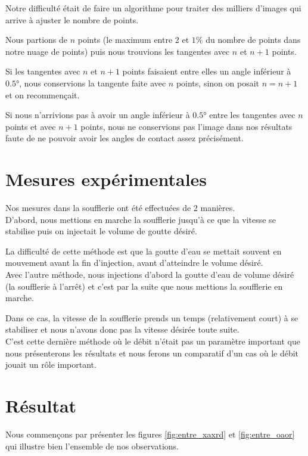 Notre difficulté était de faire un algorithme pour traiter des milliers d'images qui arrive à ajuster le nombre de points.

Nous partions de $n$ points (le maximum entre 2 et $1\%$ du nombre de points dans notre nuage de points) puis nous trouvions les tangentes avec $n$ et $n+1$ points.

Si les tangentes avec $n$ et $n+1$ points faisaient entre elles un angle inférieur à $\ang{0.5}$, nous conservions la tangente faite avec $n$ points, sinon on posait $n = n+1$ et on recommençait.

Si nous n'arrivions pas à avoir un angle inférieur à $\ang{0.5}$  entre les tangentes avec $n$ points et avec $n+1$ points, nous ne conservions pas l'image dans nos résultats faute de ne pouvoir avoir les angles de contact assez précisément.

\section{Mesures expérimentales}

Nos mesures dans la soufflerie ont été effectuées de 2 manières.\\

D'abord, nous mettions en marche la soufflerie jusqu'à ce que la vitesse se stabilise puis on injectait le volume de goutte désiré.

La difficulté de cette méthode est que la goutte d'eau se mettait souvent en mouvement avant la fin d'injection, avant d'atteindre le volume désiré.\\

Avec l'autre méthode, nous injections d'abord la goutte d'eau de volume désiré (la soufflerie à l'arrêt) et c'est par la suite que nous mettions la soufflerie en marche.

Dans ce cas, la vitesse de la soufflerie prends un temps (relativement court) à se stabiliser et nous n'avons donc pas la vitesse désirée toute suite.\\

C'est cette dernière méthode où le débit n'était pas un paramètre important que nous présenterons les résultats et nous ferons un comparatif d'un cas où le débit jouait un rôle important.
\newpage
\section{Résultat}

Nous commençons par présenter les figures \ref{fig:entre_xaxrd} et \ref{fig:entre_oaor} qui illustre bien l'ensemble de nos observations.\\

